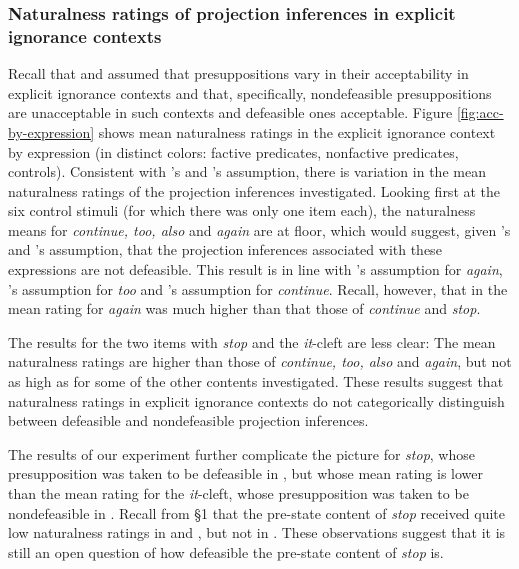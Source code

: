 \documentclass[11pt,fleqn]{article}
\newcommand{\6}{\mbox{$[\hspace*{-.6mm}[$}}
\newcommand{\9}{\mbox{$]\hspace*{-.6mm}]$}}
\newcommand{\citepos}[1]{\citeauthor{#1}'s \citeyear{#1}}
\begin{document}
\subsubsection{Naturalness ratings of projection inferences in explicit ignorance contexts}\label{s:analysis1}

Recall that \citealt{simons01} and \citealt{abusch10} assumed that presuppositions vary in their acceptability in explicit ignorance contexts and that, specifically, nondefeasible presuppositions are unacceptable in such contexts and defeasible ones  acceptable. Figure \ref{fig:acc-by-expression} shows mean naturalness ratings in the explicit ignorance context by expression (in distinct colors: \color{orange}factive predicates\color{black}, \color{black}nonfactive predicates\color{black}, \color{gray}controls\color{black}). Consistent with \citepos{simons01} and \citepos{abusch10} assumption, there is variation in the mean naturalness ratings of the projection inferences investigated. Looking first at the six control stimuli (for which there was only one item each), the naturalness means for \emph{continue, too, also} and \emph{again} are at floor, which would suggest, given \citepos{simons01} and \citepos{abusch10} assumption, that the projection inferences associated with these expressions are not defeasible. This result is in line with \citepos{simons01} assumption for \emph{again}, \citepos{abusch10} assumption for \emph{too} and \citepos{roberts-simons2024} assumption for \emph{continue}. Recall, however, that in \citealt[Exp.~2]{kalomoiros-schwarz2024} the mean rating for \emph{again} was much higher than that those of \emph{continue} and \emph{stop}. 

The results for the two items with \emph{stop} and the \emph{it}-cleft are less clear: The mean naturalness ratings are higher than those of \emph{continue, too, also} and \emph{again}, but not as high as for some of the other contents investigated. These results suggest that naturalness ratings in explicit ignorance contexts do not categorically distinguish between defeasible and nondefeasible projection inferences. 

The results of our experiment further complicate the picture for \emph{stop}, whose presupposition was taken to be defeasible in \citealt{simons01}, but whose mean rating is lower than the mean rating for the \emph{it}-cleft, whose presupposition was taken to be nondefeasible in \citealt{abusch10}. Recall from \S1 that the pre-state content of \emph{stop} received quite low naturalness ratings in \citealt[Exp.~3]{mandelkern-etal2020} and \citealt[Exp.~2]{kalomoiros-schwarz2024}, but not in \citealt[Exp.~1]{kalomoiros-schwarz2024}. These observations suggest that it is still an open question of how defeasible the pre-state content of \emph{stop} is.
\end{document}
